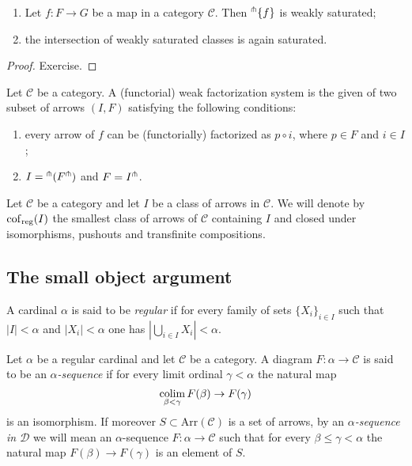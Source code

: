 \begin{refsection}
\begin{lemma} \label{lemma llp saturation}
\begin{enumerate}
\item Let $f \colon F \to G$ be a map in a category $\mathcal C$. Then ${}^{\pitchfork}\{f\}$ is weakly saturated;

\item the intersection of weakly saturated classes is again saturated.
\end{enumerate}
\end{lemma}

\begin{proof}
Exercise.
\end{proof}

\begin{defin}
Let $\mathcal C$ be a category. A (functorial) weak factorization system is the given of two subset of arrows $(I,F)$ satisfying the following conditions:
\begin{enumerate}
\item every arrow of $f$ can be (functorially) factorized as $p \circ i$, where $p \in F$ and $i \in I$;

\item $I = {}^{\pitchfork}(F^{\pitchfork})$ and $F = I^{\pitchfork}$.
\end{enumerate}
\end{defin}

\begin{defin}
Let $\mathcal C$ be a category and let $I$ be a class of arrows in $\mathcal C$. We will denote by $\mathrm{cof}_{\mathrm{reg}}(I)$ the smallest class of arrows of $\mathcal C$ containing $I$ and closed under isomorphisms, pushouts and transfinite compositions.
\end{defin}

\subsection{The small object argument}

\begin{defin} \label{def regular cardinal}
A cardinal $\alpha$ is said to be \emph{regular} if for every family of sets $\{X_i\}_{i \in I}$ such that $|I| < \alpha$ and $|X_i| < \alpha$ one has $\left| \bigcup_{i \in I} X_i \right| < \alpha$.
\end{defin}

\begin{defin}
Let $\alpha$ be a regular cardinal and let $\mathcal C$ be a category. A diagram $F \colon \alpha \to \mathcal C$ is said to be an \emph{$\alpha$-sequence} if for every limit ordinal $\gamma < \alpha$ the natural map
\[
\operatorname*{colim}_{\beta < \gamma} F(\beta) \to F(\gamma)
\]
is an isomorphism. If moreover $S \subset \mathrm{Arr}(\mathcal C)$ is a set of arrows, by an \emph{$\alpha$-sequence in $\mathcal D$} we will mean an $\alpha$-sequence $F \colon \alpha \to \mathcal C$ such that for every $\beta \le \gamma < \alpha$ the natural map $F(\beta) \to F(\gamma)$ is an element of $S$.
\end{defin}


\end{refsection}
